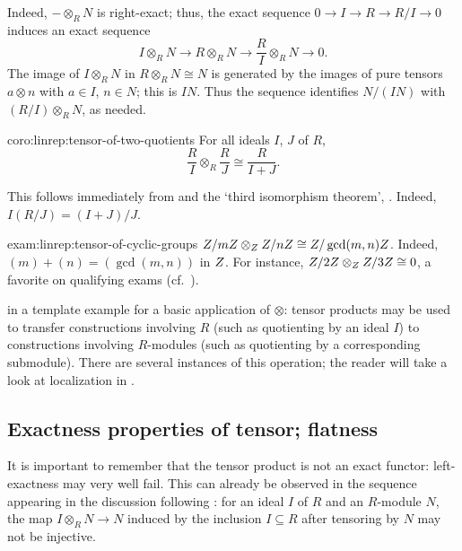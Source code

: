 Indeed, $\mathord{-} \otimes_R N$ is right-exact; thus, the exact
sequence $0 \to I \to R \to R/I \to 0$ induces an exact sequence
\[
  I \otimes_R N \to R \otimes_R N \to \frac{R}{I} \otimes_R N \to 0.
\]
The image of $I \otimes_R N$ in $R \otimes_R N \cong N$ is generated
by the images of pure tensors $a \otimes n$ with $a \in I$, $n \in N$;
this is $IN$. Thus the sequence identifies $N/(IN)$ with
$(R/I) \otimes_R N$, as needed.
\begin{coro}{}{coro:linrep:tensor-of-two-quotients}
  For all ideals $I$, $J$ of $R$,
  \[
    \frac{R}{I} \otimes_R \frac{R}{J} \cong \frac{R}{I + J}.
  \]
\end{coro}

This follows immediately from  and the `third
isomorphism theorem', . Indeed,
$I(R/J) = (I+J)/J$.

\begin{exam}{}{exam:linrep:tensor-of-cyclic-groups}
  $Z/mZ \otimes_{Z} Z/nZ \cong Z/\gcd(m,n)Z$.  Indeed,
  $(m)+(n) = (\gcd(m,n))$ in $Z$. For instance,
  $Z/2Z \otimes_{Z} Z/3Z \cong 0$, a favorite on qualifying exams
  (cf.\ ).
\end{exam}

 in
a template example for a basic application of
$\otimes$: tensor products may be used to transfer constructions
involving $R$ (such as quotienting by an ideal $I$) to constructions
involving $R$-modules (such as quotienting by a corresponding
submodule). There are several instances of this operation; the reader
will take a look at localization in
.

\subsection{Exactness properties of tensor; flatness}%
\label{subsec:linrep:exactness-properties-of-tensor-flatness}
It is important to remember that the tensor product is not an exact
functor: left-exactness may very well fail. This can already be
observed in the sequence appearing in the discussion following
: for an
ideal $I$ of $R$ and an $R$-module $N$, the
map $I \otimes_R N \to N$ induced by the inclusion $I \subseteq R$
after tensoring by $N$ may not be injective.


